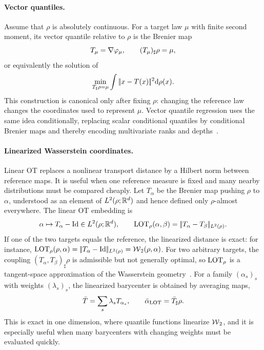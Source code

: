 \paragraph{Vector quantiles.}

Assume that $\rho$ is absolutely continuous. For a target law $\mu$ with finite second moment, its vector quantile relative to $\rho$ is the Brenier map
\[
	T_\mu=\nabla\varphi_\mu,
	\qquad
	(T_\mu)_\sharp\rho=\mu,
\]
or equivalently the solution of
\[
	\min_{T_\sharp\rho=\mu}
	\int |\!| x-T(x) |\!|^2\mathrm{d}\rho(x).
\]
This construction is canonical only after fixing $\rho$: changing the reference law changes the coordinates used to represent $\mu$. Vector quantile regression uses the same idea conditionally, replacing scalar conditional quantiles by conditional Brenier maps and thereby encoding multivariate ranks and depths~\cite{carlier2016vector}.

\paragraph{Linearized Wasserstein coordinates.}

Linear OT replaces a nonlinear transport distance by a Hilbert norm between reference maps. It is useful when one reference measure is fixed and many nearby distributions must be compared cheaply. Let $T_\alpha$ be the Brenier map pushing $\rho$ to $\alpha$, understood as an element of $L^2(\rho;\mathbb{R}^d)$ and hence defined only $\rho$-almost everywhere. The linear OT embedding is
\begin{equation}\label{eq-lot-embedding}
	\alpha \mapsto T_\alpha-\mathrm{Id}\in L^2(\rho;\mathbb{R}^d),
	\qquad
	\operatorname{LOT}_\rho(\alpha,\beta)=|\!| T_\alpha-T_\beta |\!|_{L^2(\rho)}.
\end{equation}
If one of the two targets equals the reference, the linearized distance is exact: for instance, $\operatorname{LOT}_\rho(\rho,\alpha)=|\!| T_\alpha-\mathrm{Id} |\!|_{L^2(\rho)}=\operatorname{\mathcal{W}}_2(\rho,\alpha)$. For two arbitrary targets, the coupling $(T_\alpha,T_\beta)_\sharp\rho$ is admissible but not generally optimal, so $\operatorname{LOT}_\rho$ is a tangent-space approximation of the Wasserstein geometry~\cite{wang2013linear}.
For a family $(\alpha_s)_s$ with weights $(\lambda_s)_s$, the linearized barycenter is obtained by averaging maps,
\[
	\bar T=\sum_s\lambda_s T_{\alpha_s},
	\qquad
	\bar\alpha_{\operatorname{LOT}}=\bar T_\sharp\rho.
\]
This is exact in one dimension, where quantile functions linearize $\operatorname{\mathcal{W}}_2$, and it is especially useful when many barycenters with changing weights must be evaluated quickly.

